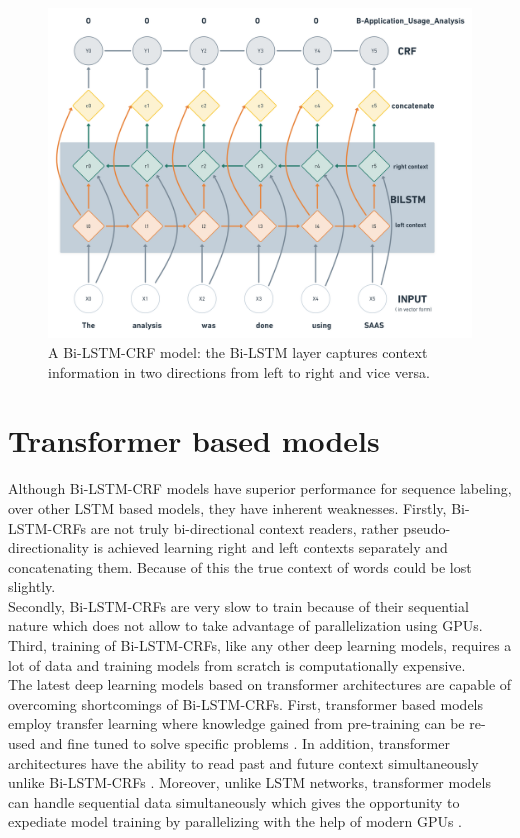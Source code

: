 \begin{figure}[htbp]
	\centering
	\includegraphics[width=.85\textwidth]{4.graphics/figures/ch_5/Bi-LSTM-CRF}
	\caption{A \ac{Bi-LSTM-CRF} model: the \ac{Bi-LSTM} layer captures context information in two directions from left to right and vice versa. }
	\label{fig:chapter03:setup}
\end{figure}

\section{Transformer based models}
\label{sec:chapter05:DLModels:Transformer}

Although Bi-LSTM-CRF models have superior performance for sequence labeling, over other LSTM based models, they have inherent weaknesses. Firstly, Bi-LSTM-CRFs are not truly bi-directional context readers, rather  pseudo-directionality is achieved learning right and left contexts separately and concatenating them. Because of this the true context of words could be lost slightly. \\

Secondly, Bi-LSTM-CRFs are very slow to train because of their sequential nature which does not allow to take  advantage of parallelization using \ac{GPU}s.  Third, training of Bi-LSTM-CRFs, like any other deep learning models, requires a lot of data and training models from scratch is computationally expensive. \\


The latest deep learning models based on transformer architectures are capable of overcoming shortcomings of Bi-LSTM-CRFs. First, transformer based models employ transfer learning where knowledge gained from pre-training can be re-used and fine tuned to solve specific problems \citep{ezen2020comparison}. In addition, transformer architectures have the ability to read past and future context simultaneously unlike Bi-LSTM-CRFs \citep{devlin2018bert}. Moreover, unlike LSTM networks, transformer models can handle sequential data simultaneously which gives the opportunity to expediate model training by parallelizing with the help of modern \ac{GPU}s \citep{ezen2020comparison}. 

